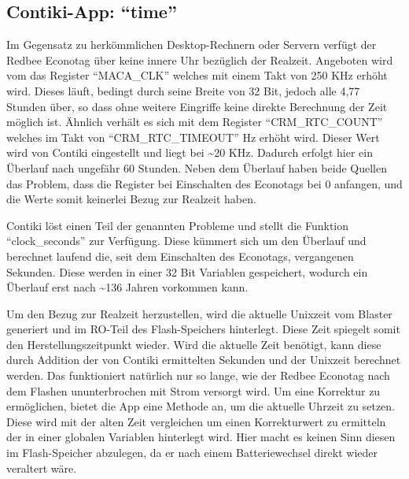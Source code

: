 \subsection{Contiki-App: "`time"'}

Im Gegensatz zu herkömmlichen Desktop-Rechnern oder Servern verfügt der Redbee Econotag über keine innere Uhr bezüglich der Realzeit.
Angeboten wird vom  das Register "`MACA\_CLK"' welches mit einem Takt von 250 KHz erhöht wird. Dieses läuft, bedingt durch
seine Breite von 32 Bit, jedoch alle 4,77 Stunden über, so dass ohne weitere Eingriffe keine direkte Berechnung der Zeit möglich ist.
Ähnlich verhält es sich mit dem Register "`CRM\_RTC\_COUNT"' welches im Takt von "`CRM\_RTC\_TIMEOUT"' Hz erhöht wird.
Dieser Wert wird von Contiki eingestellt und liegt bei \textasciitilde 20 KHz. Dadurch erfolgt hier ein Überlauf nach ungefähr 60 Stunden.
Neben dem Überlauf haben beide Quellen das Problem, dass die Register bei Einschalten des Econotags bei 0 anfangen, und die Werte somit
keinerlei Bezug zur Realzeit haben.

Contiki löst einen Teil der genannten Probleme und stellt die Funktion "`clock\_seconds"' zur Verfügung. Diese kümmert sich um den Überlauf
und berechnet laufend die, seit dem Einschalten des Econotags, vergangenen Sekunden. Diese werden in einer 32 Bit Variablen gespeichert,
wodurch ein Überlauf erst nach \textasciitilde 136 Jahren vorkommen kann.

Um den Bezug zur Realzeit herzustellen, wird die aktuelle Unixzeit vom Blaster generiert und im RO-Teil des Flash-Speichers hinterlegt.
Diese Zeit spiegelt somit den Herstellungszeitpunkt wieder. Wird die aktuelle Zeit benötigt, kann diese durch Addition der von Contiki
ermittelten Sekunden und der Unixzeit berechnet werden. Das funktioniert natürlich nur so lange, wie der Redbee Econotag nach dem Flashen
ununterbrochen mit Strom versorgt wird. Um eine Korrektur zu ermöglichen, bietet die App eine Methode an, um die aktuelle Uhrzeit zu setzen.
Diese wird mit der alten Zeit vergleichen um einen Korrekturwert zu ermitteln der in einer globalen Variablen hinterlegt wird. Hier macht es
keinen Sinn diesen im Flash-Speicher abzulegen, da er nach einem Batteriewechsel direkt wieder veraltert wäre.